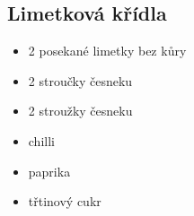 \documentclass[10pt,a4paper]{article}
\newenvironment{myitemize}
{ \begin{itemize}
    \setlength{\itemsep}{0pt}
    \setlength{\parskip}{0pt}
    \setlength{\parsep}{0pt}     }
{ \end{itemize}                  }
\begin{document}
\subsection{Limetková křídla}
\begin{minipage}[t]{0,5\textwidth}
\begin{myitemize} 
  \item 2 posekané limetky bez kůry
  \item 2 stroučky česneku
  \item 2 stroužky česneku
  \item chilli
  \item paprika
  \item třtinový cukr
 
\end{myitemize}
\end{minipage}
\begin{minipage}[t]{0,5\textwidth}
\end{minipage}
\end{document}
